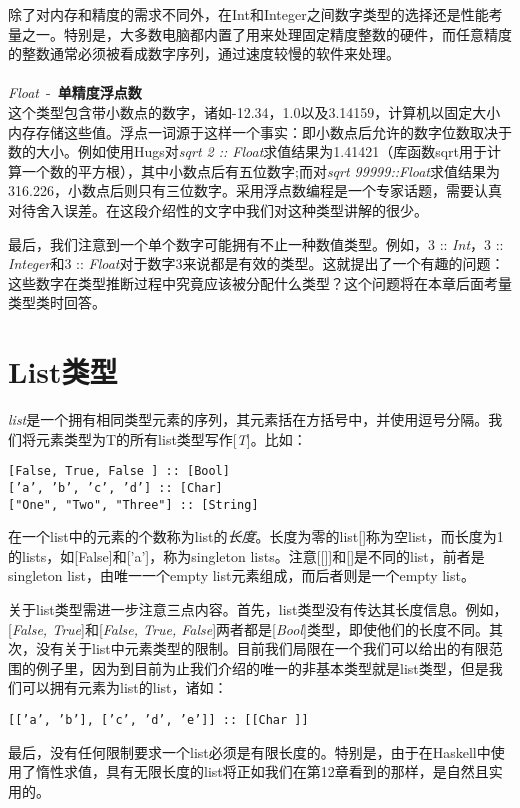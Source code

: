 除了对内存和精度的需求不同外，在Int和Integer之间数字类型的选择还是性能考量之一。特别是，大多数电脑都内置了用来处理固定精度整数的硬件，而任意精度的整数通常必须被看成数字序列，通过速度较慢的软件来处理。
\\
\\
\textit{Float}~-~\textbf{单精度浮点数}\\
这个类型包含带小数点的数字，诸如-12.34，1.0以及3.14159，计算机以固定大小内存存储这些值。浮点一词源于这样一个事实：即小数点后允许的数字位数取决于数的大小。例如使用Hugs对\textit{sqrt 2 :: Float}求值结果为1.41421（库函数sqrt用于计算一个数的平方根），其中小数点后有五位数字;而对\textit{sqrt 99999::Float}求值结果为316.226，小数点后则只有三位数字。采用浮点数编程是一个专家话题，需要认真对待舍入误差。在这段介绍性的文字中我们对这种类型讲解的很少。

最后，我们注意到一个单个数字可能拥有不止一种数值类型。例如，3 :: \textit{Int}，3 :: \textit{Integer}和3 :: \textit{Float}对于数字3来说都是有效的类型。这就提出了一个有趣的问题：这些数字在类型推断过程中究竟应该被分配什么类型？这个问题将在本章后面考量类型类时回答。

\section{List类型}
\textit{list}是一个拥有相同类型元素的序列，其元素括在方括号中，并使用逗号分隔。我们将元素类型为T的所有list类型写作[\textit{T}]。比如：

\begin{verbatim}
[False, True, False ] :: [Bool]
[’a’, ’b’, ’c’, ’d’] :: [Char]
["One", "Two", "Three"] :: [String]
\end{verbatim}

在一个list中的元素的个数称为list的\textit{长度}。长度为零的list[]称为空list，而长度为1的lists，如[False]和['a']，称为singleton lists。注意[[]]和[]是不同的list，前者是singleton list，由唯一一个empty list元素组成，而后者则是一个empty list。

关于list类型需进一步注意三点内容。首先，list类型没有传达其长度信息。例如，[\textit{False,
True}]和[\textit{False, True,
False}]两者都是[\textit{Bool}]类型，即使他们的长度不同。其次，没有关于list中元素类型的限制。目前我们局限在一个我们可以给出的有限范围的例子里，因为到目前为止我们介绍的唯一的非基本类型就是list类型，但是我们可以拥有元素为list的list，诸如：
\begin{verbatim}
[[’a’, ’b’], [’c’, ’d’, ’e’]] :: [[Char ]]
\end{verbatim}
最后，没有任何限制要求一个list必须是有限长度的。特别是，由于在Haskell中使用了惰性求值，具有无限长度的list将正如我们在第12章看到的那样，是自然且实用的。

